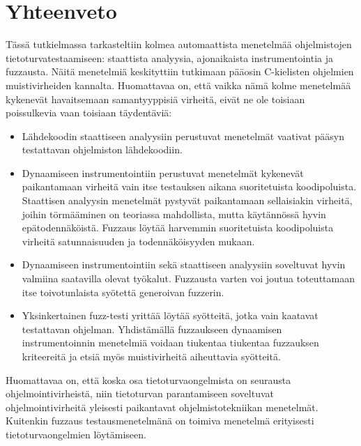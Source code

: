 \section{Yhteenveto}
Tässä tutkielmassa tarkasteltiin kolmea automaattista menetelmää ohjelmistojen tietoturvatestaamiseen:
staattista analyysia, ajonaikaista instrumentointia ja fuzzausta.
Näitä menetelmiä keskityttiin tutkimaan pääosin C-kielisten ohjelmien muistivirheiden kannalta.
Huomattavaa on, että vaikka nämä kolme menetelmää kykenevät havaitsemaan samantyyppisiä virheitä,
eivät ne ole toisiaan poissulkevia vaan toisiaan täydentäviä:
\begin{itemize}
    \item Lähdekoodin staattiseen analyysiin perustuvat menetelmät vaativat pääsyn
          testattavan ohjelmiston lähdekoodiin.
    \item Dynaamiseen instrumentointiin perustuvat menetelmät kykenevät paikantamaan virheitä
          vain itse testauksen aikana suoritetuista koodipoluista.
          Staattisen analyysin menetelmät pystyvät paikantamaan sellaisiakin virheitä,
          joihin törmääminen on teoriassa mahdollista, mutta käytännössä hyvin epätodennäköistä.
          Fuzzaus löytää harvemmin suoritetuista koodipoluista virheitä satunnaisuuden ja todennäköisyyden mukaan.
    \item Dynaamiseen instrumentointiin sekä staattiseen analyysiin soveltuvat hyvin valmiina saatavilla olevat työkalut.
          Fuzzausta varten voi joutua toteuttamaan itse toivotunlaista syötettä generoivan fuzzerin.
    \item Yksinkertainen fuzz-testi yrittää löytää syötteitä, jotka vain kaatavat testattavan ohjelman.
          Yhdistämällä fuzzaukseen dynaamisen instrumentoinnin menetelmiä voidaan tiukentaa
          tiukentaa fuzzauksen kriteereitä ja etsiä myös muistivirheitä aiheuttavia syötteitä.
\end{itemize}
Huomattavaa on, että koska osa tietoturvaongelmista on seurausta ohjelmointivirheistä,
niin tietoturvan parantamiseen soveltuvat ohjelmointivirheitä yleisesti paikantavat ohjelmistotekniikan menetelmät.
Kuitenkin fuzzaus testausmenetelmänä on toimiva menetelmä erityisesti tietoturvaongelmien löytämiseen.
\fixme[kirjoita]
